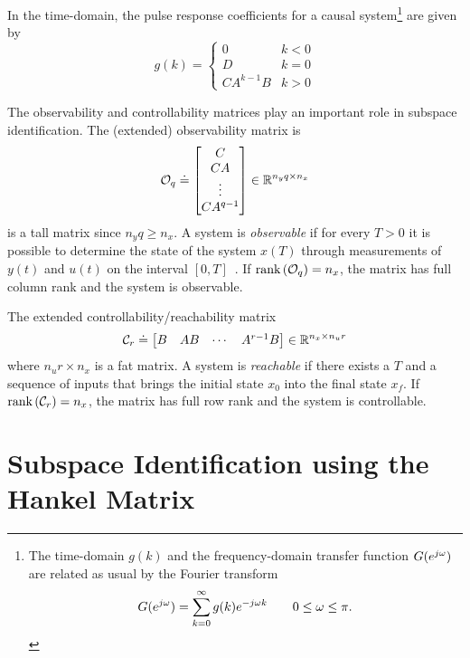 In the time-domain, the pulse response coefficients for a causal system\footnote{The time-domain $g(k)$ and the frequency-domain transfer function $G(e^{j\omega})$ are related as usual by the Fourier transform
  \begin{equation*}
    G(e^{j\omega}) = \sum_{k=0}^\infty g(k)e^{-j\omega k}\hspace{2em} 0 \leq \omega \leq \pi.
  \end{equation*}
} are given by
\begin{equation}
  \label{eq:pulse-response-coefficients}
  g(k) =
  \begin{cases}
    0 & k < 0 \\
    D & k = 0 \\
    CA^{k-1}B & k > 0
  \end{cases}
\end{equation}

The observability and controllability matrices play an important role in subspace identification. The (extended) observability matrix is
\begin{equation*}
  \mathcal{O}_q \doteq
  \begin{bmatrix}
    C \\ CA \\ \vdots \\ CA^{q-1}
  \end{bmatrix} \in \mathbb{R}^{n_yq \times n_x}
\end{equation*}
is a tall matrix since $n_yq \geq n_x$. A system is \emph{observable} if for every $T>0$ it is possible to determine the state of the system $x(T)$ through measurements of $y(t)$ and $u(t)$ on the interval $[0, T]$~\cite[Sect.~8]{fbs}. If $\textrm{rank}\left(\mathcal{O}_q\right)=n_x$, the matrix has full column rank and the system is observable.

The extended controllability/reachability matrix
\begin{equation*}
  \mathcal{C}_r \doteq
  \begin{bmatrix}
    B & AB & \cdots & A^{r-1}B
  \end{bmatrix} \in \mathbb{R}^{n_x \times n_ur}
\end{equation*}
where $n_ur\times n_x$ is a fat matrix. A system is \emph{reachable} if there exists a $T$ and a sequence of inputs that brings the initial state $x_0$ into the final state $x_f$. If $\textrm{rank}\left(\mathcal{C}_r\right)=n_x$, the matrix has full row rank and the system is controllable.

\section{Subspace Identification using the Hankel Matrix}
\label{sec:subspaces-hankel}

